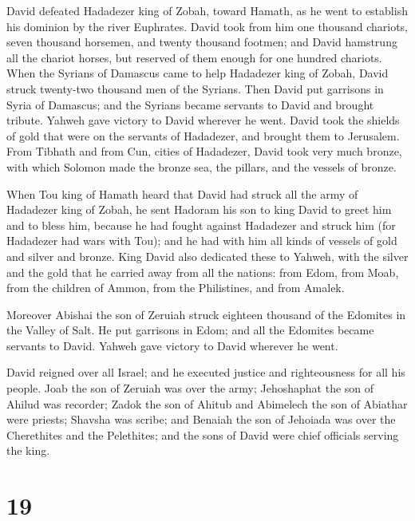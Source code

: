  David defeated Hadadezer king of Zobah, toward Hamath, as
he went to establish his dominion by the river Euphrates. 
David took from him one thousand chariots, seven thousand horsemen, and
twenty thousand footmen; and David hamstrung all the chariot horses, but
reserved of them enough for one hundred chariots.  When
the Syrians of Damascus came to help Hadadezer king of Zobah, David
struck twenty-two thousand men of the Syrians.  Then David
put garrisons in Syria of Damascus; and the Syrians became servants to
David and brought tribute. Yahweh gave victory to David wherever he
went.  David took the shields of gold that were on the
servants of Hadadezer, and brought them to Jerusalem. 
From Tibhath and from Cun, cities of Hadadezer, David took very much
bronze, with which Solomon made the bronze sea, the pillars, and the
vessels of bronze.

 When Tou king of Hamath heard that David had struck all
the army of Hadadezer king of Zobah,  he sent Hadoram his
son to king David to greet him and to bless him, because he had fought
against Hadadezer and struck him (for Hadadezer had wars with Tou); and
he had with him all kinds of vessels of gold and silver and bronze.
 King David also dedicated these to Yahweh, with the
silver and the gold that he carried away from all the nations: from
Edom, from Moab, from the children of Ammon, from the Philistines, and
from Amalek.

 Moreover Abishai the son of Zeruiah struck eighteen
thousand of the Edomites in the Valley of Salt.  He put
garrisons in Edom; and all the Edomites became servants to David. Yahweh
gave victory to David wherever he went.

 David reigned over all Israel; and he executed justice
and righteousness for all his people.  Joab the son of
Zeruiah was over the army; Jehoshaphat the son of Ahilud was recorder;
 Zadok the son of Ahitub and Abimelech the son of
Abiathar were priests; Shavsha was scribe;  and Benaiah
the son of Jehoiada was over the Cherethites and the Pelethites; and the
sons of David were chief officials serving the king.

\hypertarget{section-18}{%
\section{19}\label{section-18}}

